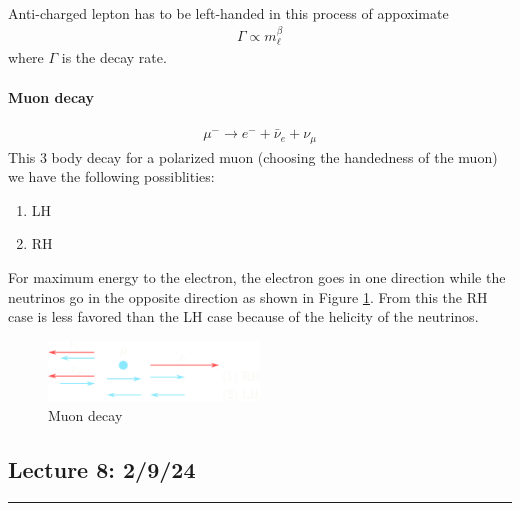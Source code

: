 \documentclass[../main.tex]{subfiles}
\begin{document}
\paragraph*{} Anti-charged lepton has to be left-handed in this process of appoximate
\begin{align*}
    \Gamma \propto m_\ell^\beta
\end{align*}
where $\Gamma$ is the decay rate.

\paragraph*{Muon decay}
\begin{align*}
    \mu^- \to e^- + \bar \nu_e + \nu_\mu
\end{align*}
This 3 body decay for a polarized muon (choosing the handedness of the muon) we have the following
possiblities:
\begin{enumerate}
    \item LH
    \item RH
\end{enumerate}
For maximum energy to the electron, the electron goes in one direction while the neutrinos go in the
opposite direction as shown in Figure \ref{fig:muon_decay}. From this the RH case is less favored
than the LH case because of the helicity of the neutrinos.
\begin{figure}[ht]
    \centering
    \includegraphics[width=0.5\textwidth]{muon_decay.png}
    \caption{Muon decay}
    \label{fig:muon_decay}
\end{figure}

\newpage
\subsection*{Lecture 8: \hfill  2/9/24}
\hrule \vspace{10px}
\end{document}
